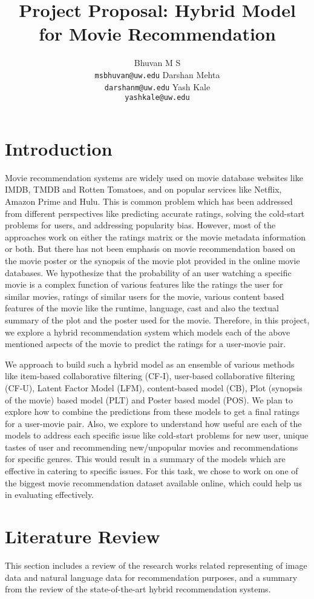 \documentclass{article}
\title{Project Proposal: Hybrid Model for Movie Recommendation}
\author{%
  Bhuvan M S \\
  \texttt{msbhuvan@uw.edu}
  \AND
  Darshan Mehta \\
  \texttt{darshanm@uw.edu}
  \AND
  Yash Kale \\
  \texttt{yashkale@uw.edu}
}
\begin{document}
\maketitle

\section{Introduction}
Movie recommendation systems are widely used on movie database websites like IMDB, TMDB and Rotten Tomatoes, and on popular services like Netflix, Amazon Prime and Hulu. This is common problem which has been addressed from different perspectives like predicting accurate ratings, solving the cold-start problems for users, and addressing popularity bias. However, most of the approaches work on either the ratings matrix or the movie metadata information or both. But there has not been emphasis on movie recommendation based on the movie poster or the synopsis of the movie plot provided in the online movie databases. We hypothesize that the probability of an user watching a specific movie is a complex function of various features like the ratings the user for similar movies, ratings of similar users for the movie, various content based features of the movie like the runtime, language, cast and also the textual summary of the plot and the poster used for the movie. Therefore, in this project, we explore a hybrid recommendation system which models each of the above mentioned aspects of the movie to predict the ratings for a user-movie pair.

We approach to build such a hybrid model as an ensemble of various methods like item-based collaborative filtering (CF-I), user-based collaborative filtering (CF-U), Latent Factor Model (LFM), content-based model (CB), Plot (synopsis of the movie) based model (PLT) and Poster based model (POS). We plan to explore how to combine the predictions from these models to get a final ratings for a user-movie pair. Also, we explore to understand how useful are each of the models to address each specific issue like cold-start problems for new user, unique tastes of user and recommending new/unpopular movies and recommendations for specific genres. This would result in a summary of the models which are effective in catering to specific issues. For this task, we chose to work on one of the biggest movie recommendation dataset available online, which could help us in evaluating effectively.


\section{Literature Review}
This section includes a review of the research works related representing of image data and natural language data for recommendation purposes, and a summary from the review of the state-of-the-art hybrid recommendation systems.
\end{document}
